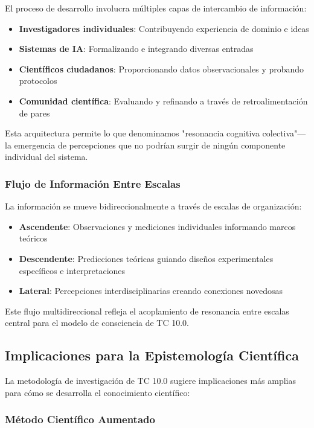 \documentclass[12pt]{article}
\begin{document}
El proceso de desarrollo involucra múltiples capas de intercambio de información:

\begin{itemize}
    \item \textbf{Investigadores individuales}: Contribuyendo experiencia de dominio e ideas
    \item \textbf{Sistemas de IA}: Formalizando e integrando diversas entradas
    \item \textbf{Científicos ciudadanos}: Proporcionando datos observacionales y probando protocolos
    \item \textbf{Comunidad científica}: Evaluando y refinando a través de retroalimentación de pares
\end{itemize}

Esta arquitectura permite lo que denominamos "resonancia cognitiva colectiva"—la emergencia de percepciones que no podrían surgir de ningún componente individual del sistema.

\subsubsection{Flujo de Información Entre Escalas}

La información se mueve bidireccionalmente a través de escalas de organización:

\begin{itemize}
    \item \textbf{Ascendente}: Observaciones y mediciones individuales informando marcos teóricos
    \item \textbf{Descendente}: Predicciones teóricas guiando diseños experimentales específicos e interpretaciones
    \item \textbf{Lateral}: Percepciones interdisciplinarias creando conexiones novedosas
\end{itemize}

Este flujo multidireccional refleja el acoplamiento de resonancia entre escalas central para el modelo de consciencia de TC 10.0.

\subsection{Implicaciones para la Epistemología Científica}

La metodología de investigación de TC 10.0 sugiere implicaciones más amplias para cómo se desarrolla el conocimiento científico:

\subsubsection{Método Científico Aumentado}
\end{document}
